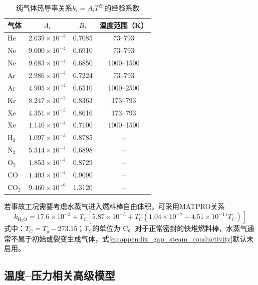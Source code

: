 \begin{table}[htbp]
	\centering
	\caption{纯气体热导率关系$k_i=A_iT^{B_i}$的经验系数}
	\label{tab:appendix_gap_gas_conductivity_coefficients}
	\begin{tabular*}{\textwidth}{
			@{\extracolsep{\fill}}
			lccc
			@{}
		}
		\toprule
		气体 & $A_i$ & $B_i$ & 温度范围（K） \\
		\midrule
		He  & $2.639\times10^{-3}$ & 0.7085 & 73--793 \\
		Ne  & $9.000\times10^{-4}$ & 0.6910 & 73--793 \\
		Ne  & $9.683\times10^{-4}$ & 0.6850 & 1000--1500 \\
		Ar  & $2.986\times10^{-4}$ & 0.7224 & 73--793 \\
		Ar  & $4.905\times10^{-4}$ & 0.6510 & 1000--2500 \\
		Kr  & $8.247\times10^{-5}$ & 0.8363 & 173--793 \\
		Xe  & $4.351\times10^{-5}$ & 0.8616 & 173--793 \\
		Xe  & $1.140\times10^{-4}$ & 0.7100 & 1000--1500 \\
		$\mathrm{H}_2$ & $1.097\times10^{-3}$ & 0.8785 & -- \\
		$\mathrm{N}_2$ & $5.314\times10^{-4}$ & 0.6898 & -- \\
		$\mathrm{O}_2$ & $1.853\times10^{-4}$ & 0.8729 & -- \\
		CO & $1.403\times10^{-4}$ & 0.9090 & -- \\
		$\mathrm{CO}_2$ & $9.460\times10^{-6}$ & 1.3120 & -- \\
		\bottomrule
	\end{tabular*}
\end{table}

若事故工况需要考虑水蒸气进入燃料棒自由体积，可采用MATPRO关系
\begin{equation}
	k_{\mathrm{H_2O}}
	=17.6\times10^{-3}
	+T_C\left[
	5.87\times10^{-5}
	+T_C\left(1.04\times10^{-7}
	-4.51\times10^{-11}T_C\right)
	\right]
	\label{eq:appendix_gap_steam_conductivity}
\end{equation}
式中：$T_C=T_g-273.15$；$T_C$的单位为$^\circ\mathrm C$。对于正常密封的快堆燃料棒，水蒸气通常不属于初始或裂变生成气体，式\eqref{eq:appendix_gap_steam_conductivity}默认未启用。

\subsection{温度--压力相关高级模型}
\label{app:gap_advanced_gas_conductivity}

